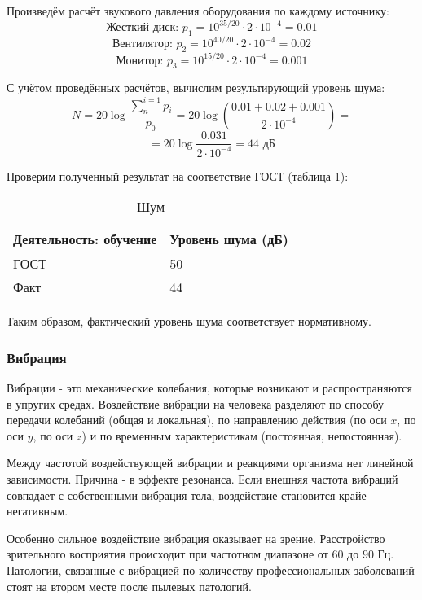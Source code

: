 Произведём расчёт звукового давления оборудования по каждому источ\-нику:
$$
\mbox{Жесткий диск: } p_1= 10^{35/20}\cdot 2 \cdot 10^{-4} = 0.01
$$
$$
\mbox{Вентилятор: } p_2= 10^{40/20}\cdot 2 \cdot 10^{-4} = 0.02
$$
$$
\mbox{Монитор: } p_3= 10^{15/20}\cdot 2 \cdot 10^{-4} = 0.001
$$

С учётом проведённых расчётов, вычислим результирующий уровень шу\-ма:
$$
N = 20 \log \frac{\sum\limits_{n}^{i=1}p_i}{p_0} =  20 \log \left(\frac{0.01 + 0.02 + 0.001}{2 \cdot 10^{-4}}\right) = 
$$
$$
=  20 \log \frac{0.031}{2 \cdot 10^{-4}} = 44 \mbox{ дБ}
$$

Проверим полученный результат на соответствие ГОСТ (таблица \ref{noise}):

\begin{table}[H]
\caption{Шум\label{noise}}
\begin{center}
\begin{tabular}{|p{4cm}|p{3cm}|}
\hline
Деятельность: обучение & Уровень шума (дБ)  \\
\hline
ГОСТ & 50  \\
\hline
Факт & 44  \\
\hline
\end{tabular}
\end{center}
\end{table}

Таким образом, фактический уровень шума соответствует нормативному.

\subsubsection{Вибрация}

Вибрации - это механические колебания, которые возникают и распро\-страняются в упругих средах. Воздействие вибрации на человека разделяют по способу передачи коле\-баний (общая и локальная), по направлению дей\-ствия (по оси $x$, по оси $y$, по оси $z$) и по временным характеристикам (по\-стоянная, непостоянная).

Между частотой воздействующей вибрации и реакциями организма нет линейной зави\-симости. Причина - в эффекте резонанса. Если внешняя частота вибраций совпадает с собственными вибрация тела, воздействие становится крайе негативным.

Особенно сильное воздействие вибрация оказывает на зрение. Расстрой\-ство зрительного восприятия происходит при частотном диапазоне от $60$ до $90$ Гц. Патологии, связанные с вибрацией по количеству профессиональных заболеваний стоят на втором месте после пылевых патологий.


